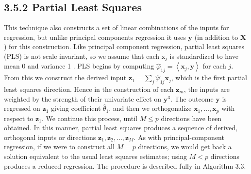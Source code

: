 \documentclass[10pt]{article}
\begin{document}
\subsection*{3.5.2 Partial Least Squares}
This technique also constructs a set of linear combinations of the inputs for regression, but unlike principal components regression it uses $\mathbf{y}$ (in addition to $\mathbf{X}$ ) for this construction. Like principal component regression, partial least squares (PLS) is not scale invariant, so we assume that each $\mathrm{x}_{j}$ is standardized to have mean 0 and variance 1 . PLS begins by computing $\hat{\varphi}_{1 j}=\left\langle\mathbf{x}_{j}, \mathbf{y}\right\rangle$ for each $j$. From this we construct the derived input $\mathbf{z}_{1}=\sum_{j} \hat{\varphi}_{1 j} \mathbf{x}_{j}$, which is the first partial least squares direction. Hence in the construction of each $\mathbf{z}_{m}$, the inputs are weighted by the strength of their univariate effect on $\mathbf{y}^{3}$. The outcome $\mathbf{y}$ is regressed on $\mathbf{z}_{1}$ giving coefficient $\hat{\theta}_{1}$, and then we orthogonalize $\mathbf{x}_{1}, \ldots, \mathbf{x}_{p}$ with respect to $\mathbf{z}_{1}$. We continue this process, until $M \leq p$ directions have been obtained. In this manner, partial least squares produces a sequence of derived, orthogonal inputs or directions $\mathbf{z}_{1}, \mathbf{z}_{2}, \ldots, \mathbf{z}_{M}$. As with principal-component regression, if we were to construct all $M=p$ directions, we would get back a solution equivalent to the usual least squares estimates; using $M<p$ directions produces a reduced regression. The procedure is described fully in Algorithm 3.3.
\end{document}

